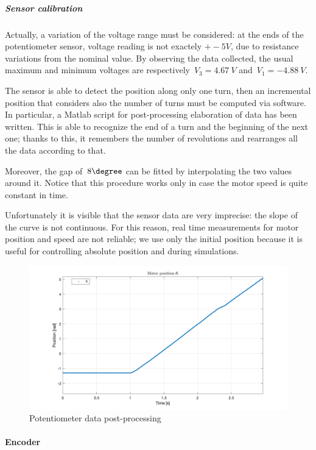 \subparagraph{Sensor calibration}
Actually, a variation of the voltage range must be considered: at the ends of the potentiometer sensor, voltage reading is not exactely $+- 5V$, due to resistance variations from the nominal value. By observing the data collected, the usual maximum and minimum voltages are respectively~$V_3=4.67 \ V$ and~$V_1=-4.88 \ V$.

The sensor is able to detect the position along only one turn, then an incremental position that considers also the number of turns must be computed via software.
In particular, a Matlab script for post-processing elaboration of data has been written. This is able to recognize the end of a turn and the beginning of the next one; thanks to this, it remembers the number of revolutions and rearranges all the data according to that.

Moreover, the gap of~$8 \degree$ can be fitted by interpolating the two values around it. Notice that this procedure works only in case the motor speed is quite constant in time.

Unfortunately it is visible that the sensor data are very imprecise: the slope of the curve is not continuous. For this reason, real time measurements for motor position and speed are not reliable; we use only the initial position because it is useful for controlling absolute position and  during simulations.
\begin{figure}
	\centering
	\includegraphics[width=\columnwidth]{images/sensors/pote_recover}
	\caption{Potentiometer data post-processing}
\end{figure}

\paragraph{Encoder}

